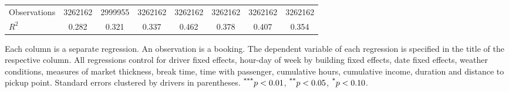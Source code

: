 \documentclass[reviewmode,AEJ]{AEA}
\begin{document}
\begin{table}[]
{\begin{tabularx}{\textwidth}{p{3.8cm}*{7}{S[table-format = 0.4, table-space-text-pre={**}, table-space-text-post={-**}]}}
        Observations        &\num{3262162}         &\num{2999955}         &\num{3262162}         &\num{3262162}         &\num{3262162}         &\num{3262162}         &\num{3262162}         \\
        \(R^2\)             & \num{0.282}         & \num{0.321}         & \num{0.337}         & \num{0.462}         & \num{0.378}         & \num{0.407}         & \num{0.354}         \\
        \bottomrule
		\end{tabularx}
		}
		\begin{tablenotes}
	    	\small
			Each column is a separate regression. An observation is a booking. The dependent variable of each regression is specified in the title of the respective column. All regressions control for driver fixed effects, hour-day of week by building fixed effects, date fixed effects, weather conditions, measures of market thickness, break time, time with passenger, cumulative hours, cumulative income, duration and distance to pickup point. Standard errors clustered by drivers in parentheses. $\textsuperscript{***}p < 0.01$, $\textsuperscript{**}p < 0.05$, $\textsuperscript{*}p < 0.10$.  
		\end{tablenotes}
\end{table}



\clearpage

\end{document}
